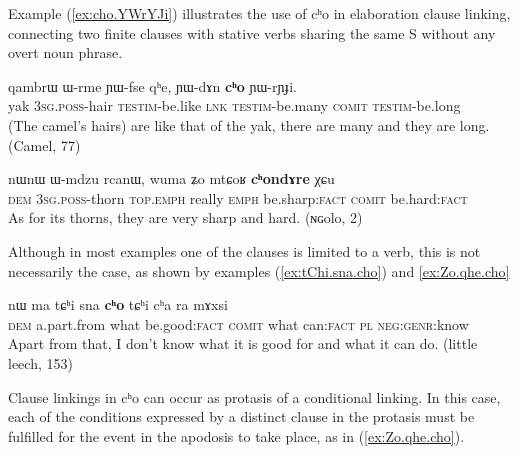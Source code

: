 \documentclass[oldfontcommands,oneside,a4paper,11pt]{article}
\newcommand{\ipa}[1]{{\phon \mbox{#1}}} %
\newcommand{\refb}[1]{(\ref{#1})}
\begin{document}
Example \refb{ex:cho.YWrYJi} illustrates the use of \ipa{cʰo} in elaboration clause linking, connecting two finite clauses with stative verbs sharing the same S without any overt noun phrase.

\begin{exe}
\ex \label{ex:cho.YWrYJi}
\gll
\ipa{qambrɯ}  	\ipa{ɯ-rme}  	\ipa{ɲɯ-fse}  	\ipa{qʰe,}  	\ipa{ɲɯ-dɤn}  	\ipa{\textbf{cʰo}}  	\ipa{ɲɯ-rɲɟi.}  \\
yak \textsc{3sg.poss}-hair \textsc{testim}-be.like \textsc{lnk} \textsc{testim}-be.many \textsc{comit} \textsc{testim}-be.long \\
\glt (The camel's hairs) are like that of the yak, there are many and they are long. (Camel, 77)
\end{exe}

\begin{exe}
\ex \label{ex:chondAre}
\gll
\ipa{nɯnɯ}  	\ipa{ɯ-mdzu}  	\ipa{rcanɯ,}  	\ipa{wuma}  	\ipa{ʑo}  	\ipa{mtɕoʁ}  	\ipa{\textbf{cʰondɤre}}  	\ipa{χɕu}  \\
\textsc{dem} \textsc{3sg.poss}-thorn \textsc{top.emph} really \textsc{emph} be.sharp:\textsc{fact} \textsc{comit} be.hard:\textsc{fact} \\
\glt As for its thorns, they are very sharp and hard. (ɴɢolo, 2)
\end{exe}

Although in most examples one of the clauses is limited to a verb, this is not necessarily the case, as shown by   examples \refb{ex:tChi.sna.cho} and \ref{ex:Zo.qhe.cho}

\begin{exe}
\ex \label{ex:tChi.sna.cho}
\gll
\ipa{nɯ}  	\ipa{ma}  	 \ipa{tɕʰi}  	\ipa{sna}  	\ipa{\textbf{cʰo}}  	\ipa{tɕʰi}  	\ipa{cʰa}  	\ipa{ra}  	\ipa{mɤxsi}  \\
\textsc{dem} a.part.from what be.good:\textsc{fact} \textsc{comit} what can:\textsc{fact} \textsc{pl} \textsc{neg:genr}:know\\
\glt Apart from that, I don't know what it is good for and what it can do. (little leech, 153)
\end{exe}

Clause linkings in \ipa{cʰo} can occur as protasis of a conditional linking. In this case, each of the conditions expressed by a distinct clause in the protasis must be fulfilled for the event in the apodosis to take place, as in \refb{ex:Zo.qhe.cho}.
\end{document}
